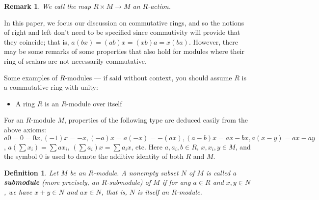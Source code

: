 \documentclass[12pt,reqno]{amsart}
\theoremstyle{plain}
\newtheorem{defi}{Definition}
\newtheorem{rem}{Remark}
\begin{document}
\begin{rem} We call the map $R \times M \to M$ an $R$-\textit{action}.
\end{rem} 


In this paper, we focus our discussion on commutative rings, and so the notions of right and left don't need to be specified since commutivity will provide that they coincide; that is, $a(bx) = (ab)x = (xb)a = x(ba)$.  However, there may be some remarks of some properties that also hold for modules where their ring of scalars are not necessarily commutative. 

Some examples of $R$-modules — if said without context, you should assume $R$ is a commutative ring with unity:
\begin{itemize}
\item A ring $R$ is an $R$-module over itself 
\end{itemize}

For an $R$-module $M$, properties of the following type are deduced easily from the above axioms: $a0 = 0 = 0x, (-1)x = -x, (-a)x = a(-x) = -(ax), (a-b)x=ax-bx, a(x-y)=ax-ay$, $a \left( \sum x_i \right) = \sum ax_i$, $\left( \sum a_i \right) x = \sum a_i x $, etc. Here $a,a_i, b \in R$, $x, x_i, y \in M$, and the symbol $0$ is used to denote the additive identity of both $R$ and $M$.
\begin{defi} Let $M$ be an $R$-module. A nonempty subset $N$ of $M$ is called a \textbf{submodule} (more precisely, an $R$-submodule) of $M$ if for any $a \in R$ and $x, y \in N$, we have $x+y \in N$ and $ax \in N$, that is, $N$ is itself an $R$-module.
\end{defi}
\end{document}
